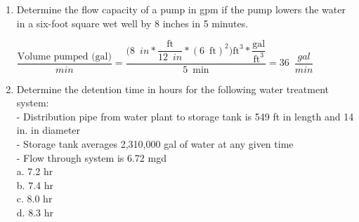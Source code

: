 \documentclass{article}
\begin{document}
\begin{enumerate}
  \item Determine the flow capacity of a pump in gpm if the pump lowers the water in a six-foot square wet well by 8 inches in 5 minutes.

$ \dfrac{\textrm{Volume pumped (gal)}}{min}=\dfrac{\Big(8\enspace in*\dfrac{\textrm{ft}}{12 \enspace in}*(6\enspace \textrm{ft})^2\Big)\textrm{ft}^3*\dfrac{\textrm{gal}}{\textrm{ft}^3}}{5\enspace \textrm{min}}=\boxed{36 \enspace \dfrac{gal}{min}}$ \\


\item Determine the detention time in hours for the following water treatment system:\\
-	Distribution pipe from water plant to storage tank is 549 ft in length and 14 in. in diameter\\
-	Storage tank averages 2,310,000 gal of water at any given time\\
-	Flow through system is 6.72 mgd\\
a.	7.2 hr\\
b.	7.4 hr\\
c.	8.0 hr\\
d.	8.3 hr\\




\end{enumerate}
\end{document}
